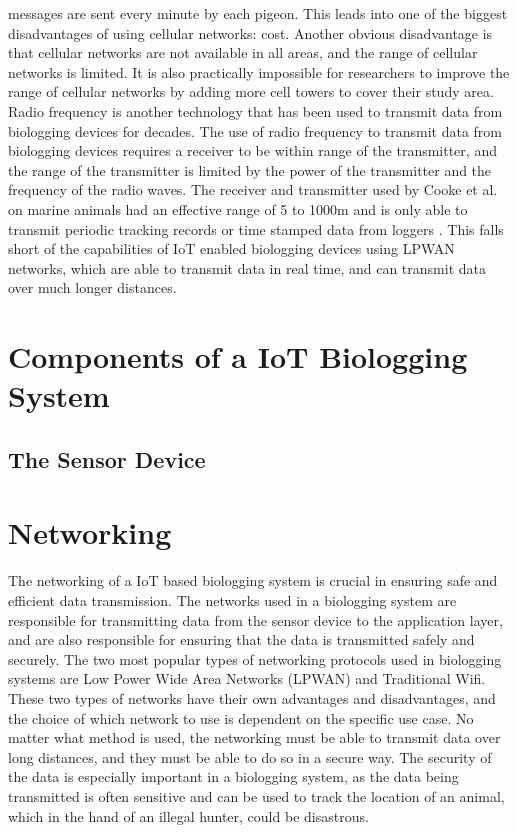 \documentclass[sigplan,screen,nonacm]{acmart}
\begin{document}
messages are sent every minute by each pigeon\cite{Martin_2006}. This leads into one of the biggest
disadvantages of using cellular networks: cost. Another obvious disadvantage
is that cellular networks are not available in all areas, and the range of
cellular networks is limited. It is also practically impossible for researchers
to improve the range of cellular networks by adding more cell towers to cover
their study area. Radio frequency is another technology that has been used to
transmit data from biologging devices for decades. The use of radio frequency
to transmit data from biologging devices requires a receiver to be within range
of the transmitter, and the range of the transmitter is limited by the power of
the transmitter and the frequency of the radio waves. The receiver and transmitter
used by Cooke et al. on marine animals had an effective range of 5 to 1000m and 
is only able to transmit periodic tracking records or time stamped data from loggers
\cite{cooke2012biotelemetry}. This falls short of the capabilities of IoT enabled 
biologging devices using LPWAN networks, which are able to transmit data in real time, and can transmit 
data over much longer distances. 

\section{Components of a IoT Biologging System}
\label{sec:Components of a IoT Biologging Device}

\subsection{The Sensor Device}
\label{subsec:The Sensor Device}


\section{Networking}
\label{sec:Networking}

The networking of a IoT based biologging system is crucial in ensuring safe and
efficient data transmission. The networks used in a biologging system
are responsible for transmitting data from the sensor device to the application
layer, and are also responsible for ensuring that the data is transmitted
safely and securely. The two most popular types of networking protocols used in
biologging systems are Low Power Wide Area Networks (LPWAN) and Traditional Wifi.
These two types of networks have their own advantages and disadvantages, and
the choice of which network to use is dependent on the specific use case. No
matter what method is used, the networking must be able to transmit data over 
long distances, and they must be able to do so in a secure way. The security 
of the data is especially important in a biologging system, as the data being 
transmitted is often sensitive and can be used to track the location of an animal, 
which in the hand of an illegal hunter, could be disastrous.
\end{document}
